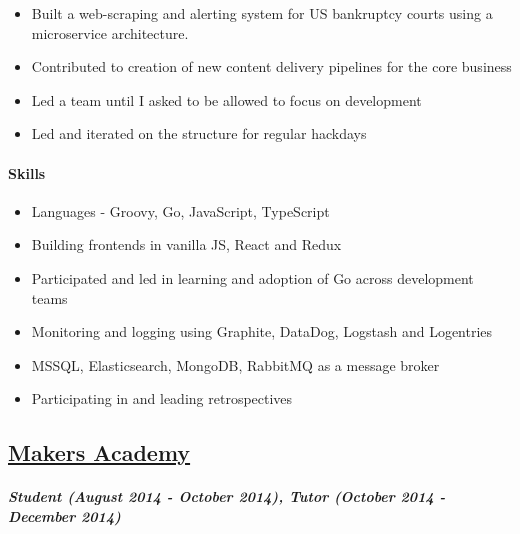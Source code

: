 \begin{itemize}
\tightlist
\item
  Built a web-scraping and alerting system for US bankruptcy courts
  using a microservice architecture.
\item
  Contributed to creation of new content delivery pipelines for the core
  business
\item
  Led a team until I asked to be allowed to focus on development
\item
  Led and iterated on the structure for regular hackdays
\end{itemize}

\hypertarget{skills-1}{%
\paragraph{Skills}\label{skills-1}}

\begin{itemize}
\tightlist
\item
  Languages - Groovy, Go, JavaScript, TypeScript
\item
  Building frontends in vanilla JS, React and Redux
\item
  Participated and led in learning and adoption of Go across development
  teams
\item
  Monitoring and logging using Graphite, DataDog, Logstash and
  Logentries
\item
  MSSQL, Elasticsearch, MongoDB, RabbitMQ as a message broker
\item
  Participating in and leading retrospectives
\end{itemize}

\hypertarget{makers-academy}{%
\subsection{\texorpdfstring{\href{http://www.makersacademy.com/}{Makers
Academy}}{Makers Academy}}\label{makers-academy}}

\hypertarget{student-august-2014---october-2014-tutor-october-2014---december-2014}{%
\paragraph{\texorpdfstring{\emph{Student (August 2014 - October 2014),
Tutor (October 2014 - December
2014)}}{Student (August 2014 - October 2014), Tutor (October 2014 - December 2014)}}\label{student-august-2014---october-2014-tutor-october-2014---december-2014}}

